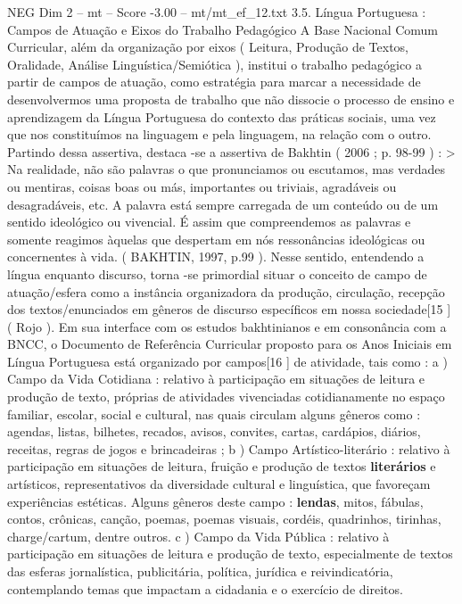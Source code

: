 \begin{textsample}{NEG Dim 2 – mt – Score -3.00 – mt/mt\_ef\_12.txt}  \label{ex:f2_neg_063}
3.5.
Língua Portuguesa : Campos de Atuação e Eixos do Trabalho Pedagógico A Base Nacional Comum Curricular, além da organização por eixos ( Leitura, Produção de Textos, Oralidade, Análise Linguística/Semiótica ), institui o trabalho pedagógico a partir de campos de atuação, como estratégia para marcar a necessidade de desenvolvermos uma proposta de trabalho que não dissocie o processo de ensino e aprendizagem da Língua Portuguesa do contexto das práticas sociais, uma vez que nos constituímos na linguagem e pela linguagem, na relação com o outro.
Partindo dessa assertiva, destaca -se a assertiva de Bakhtin ( 2006 ; p. 98-99 ) : > Na realidade, não são palavras o que pronunciamos ou escutamos, mas verdades ou mentiras, coisas boas ou más, importantes ou triviais, agradáveis ou desagradáveis, etc.
A palavra está sempre carregada de um conteúdo ou de um sentido ideológico ou vivencial.
É assim que compreendemos as palavras e somente reagimos àquelas que despertam em nós ressonâncias ideológicas ou concernentes à vida. ( BAKHTIN, 1997, p.99 ).
Nesse sentido, entendendo a língua enquanto discurso, torna -se primordial situar o conceito de campo de atuação/esfera como a instância organizadora da produção, circulação, recepção dos textos/enunciados em gêneros de discurso específicos em nossa sociedade[15 ] ( Rojo ).
Em sua interface com os estudos bakhtinianos e em consonância com a BNCC, o Documento de Referência Curricular proposto para os Anos Iniciais em Língua Portuguesa está organizado por campos[16 ] de atividade, tais como : a ) Campo da Vida Cotidiana : relativo à participação em situações de leitura e produção de texto, próprias de atividades vivenciadas cotidianamente no espaço familiar, escolar, social e cultural, nas quais circulam alguns gêneros como : agendas, listas, bilhetes, recados, avisos, convites, cartas, cardápios, diários, receitas, regras de jogos e brincadeiras ; b ) Campo Artístico-literário : relativo à participação em situações de leitura, fruição e produção de textos \textbf{literários} e artísticos, representativos da diversidade cultural e linguística, que favoreçam experiências estéticas.
Alguns gêneros deste campo : \textbf{lendas}, mitos, fábulas, contos, crônicas, canção, poemas, poemas visuais, cordéis, quadrinhos, tirinhas, charge/cartum, dentre outros. c ) Campo da Vida Pública : relativo à participação em situações de leitura e produção de texto, especialmente de textos das esferas jornalística, publicitária, política, jurídica e reivindicatória, contemplando temas que impactam a cidadania e o exercício de direitos.

\end{textsample}
